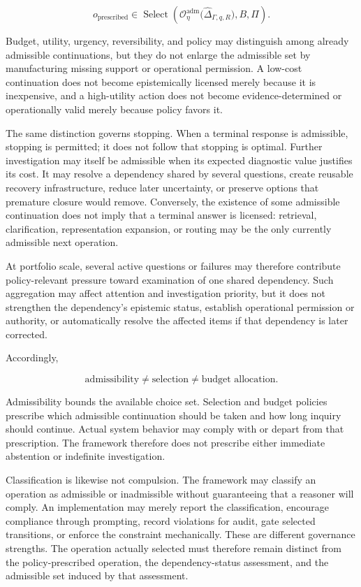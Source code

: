 \documentclass[11pt]{article}
\theoremstyle{definition}
\theoremstyle{remark}
\begin{document}
\[
o_{\mathrm{prescribed}}
\in
\operatorname{Select}
\left(
\mathcal O^{\mathrm{adm}}_{\eta}
\bigl(\widehat{\Delta}_{\Gamma,q,R}\bigr),
B,
\Pi
\right).
\]

Budget, utility, urgency, reversibility, and policy may distinguish among already admissible continuations, but they do not enlarge the admissible set by manufacturing missing support or operational permission. A low-cost continuation does not become epistemically licensed merely because it is inexpensive, and a high-utility action does not become evidence-determined or operationally valid merely because policy favors it.

The same distinction governs stopping. When a terminal response is admissible, stopping is permitted; it does not follow that stopping is optimal. Further investigation may itself be admissible when its expected diagnostic value justifies its cost. It may resolve a dependency shared by several questions, create reusable recovery infrastructure, reduce later uncertainty, or preserve options that premature closure would remove. Conversely, the existence of some admissible continuation does not imply that a terminal answer is licensed: retrieval, clarification, representation expansion, or routing may be the only currently admissible next operation.

At portfolio scale, several active questions or failures may therefore contribute policy-relevant pressure toward examination of one shared dependency. Such aggregation may affect attention and investigation priority, but it does not strengthen the dependency's epistemic status, establish operational permission or authority, or automatically resolve the affected items if that dependency is later corrected.

Accordingly,

\[
\boxed{
\text{admissibility}
\neq
\text{selection}
\neq
\text{budget allocation}.
}
\]

Admissibility bounds the available choice set. Selection and budget policies prescribe which admissible continuation should be taken and how long inquiry should continue. Actual system behavior may comply with or depart from that prescription. The framework therefore does not prescribe either immediate abstention or indefinite investigation.

Classification is likewise not compulsion. The framework may classify an operation as admissible or inadmissible without guaranteeing that a reasoner will comply. An implementation may merely report the classification, encourage compliance through prompting, record violations for audit, gate selected transitions, or enforce the constraint mechanically. These are different governance strengths. The operation actually selected must therefore remain distinct from the policy-prescribed operation, the dependency-status assessment, and the admissible set induced by that assessment.
\end{document}
